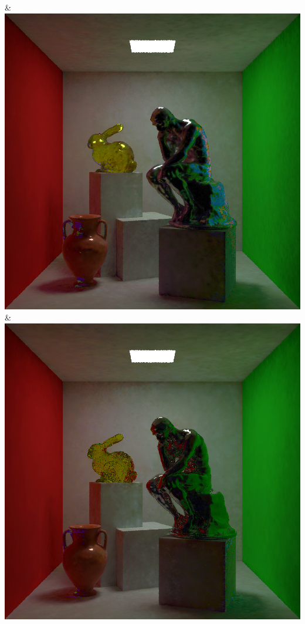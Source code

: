 & \includegraphics[width=\linewidth]{figures/py/tests/path_termination/1stvert_1spp_thinker.png}
& \includegraphics[width=\linewidth]{figures/py/tests/path_termination/1stdiff_1spp_thinker.png}

